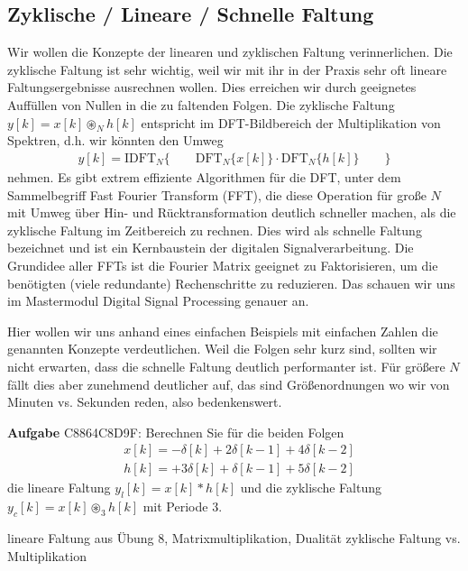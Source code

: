 \subsection{Zyklische / Lineare / Schnelle Faltung}
\label{sec:C8864C8D9F}
\begin{Ziel}
Wir wollen die Konzepte der linearen und zyklischen Faltung verinnerlichen.
Die zyklische Faltung ist sehr wichtig, weil wir mit ihr in der Praxis sehr
oft lineare Faltungsergebnisse ausrechnen wollen. Dies erreichen wir
durch geeignetes Auffüllen von Nullen in die zu faltenden Folgen.
Die zyklische Faltung $y[k] = x[k]\circledast_N h[k]$
entspricht im DFT-Bildbereich der Multiplikation von Spektren, d.h. wir könnten
den Umweg
\begin{align}
y[k] = \mathrm{IDFT}_N\{\qquad\mathrm{DFT}_N\{x[k]\} \cdot \mathrm{DFT}_N\{h[k]\}\qquad\}
\end{align}
nehmen. Es gibt extrem effiziente Algorithmen für die DFT,
unter dem Sammelbegriff Fast Fourier Transform (FFT), die diese Operation für
große $N$ mit Umweg über Hin- und Rücktransformation deutlich schneller machen,
als die zyklische Faltung im Zeitbereich zu rechnen. Dies wird als schnelle
Faltung bezeichnet und ist ein Kernbaustein der digitalen Signalverarbeitung.
Die Grundidee aller FFTs ist die Fourier Matrix geeignet zu Faktorisieren, um
die benötigten (viele redundante) Rechenschritte zu reduzieren. Das schauen
wir uns im Mastermodul Digital Signal Processing genauer an.

Hier wollen wir uns anhand eines einfachen Beispiels mit einfachen Zahlen die
genannten Konzepte verdeutlichen. Weil die Folgen sehr kurz sind, sollten wir
nicht erwarten, dass die schnelle Faltung deutlich performanter ist.
Für größere $N$ fällt dies aber zunehmend deutlicher auf, das sind Größenordnungen
wo wir von Minuten vs. Sekunden reden, also bedenkenswert.
\end{Ziel}
\textbf{Aufgabe} {\tiny C8864C8D9F}:
Berechnen Sie für die beiden Folgen
\begin{align}
&x[k] = -\delta[k] +2 \delta[k-1] + 4 \delta[k-2]\\
&h[k] = +3 \delta[k] + \delta[k-1] + 5 \delta[k-2]
\end{align}
die lineare Faltung $y_l[k] = x[k] \ast h[k]$ und die zyklische Faltung
$y_c[k] = x[k] \circledast_3 h[k]$
mit Periode $3$.
\begin{Werkzeug}
lineare Faltung aus Übung 8, Matrixmultiplikation, Dualität zyklische Faltung
vs. Multiplikation
\end{Werkzeug}
